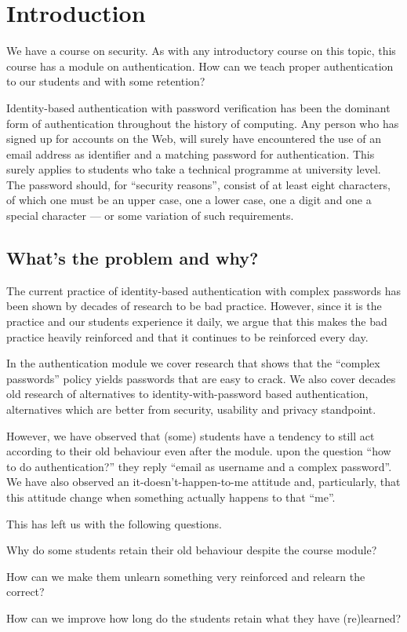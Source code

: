 \section{Introduction}

We have a course on security.
As with any introductory course on this topic, this course has a module on 
authentication.
How can we teach proper authentication to our students and with some retention?

Identity-based authentication with password verification has been the dominant 
form of authentication throughout the history of computing.
Any person who has signed up for accounts on the Web, will surely have 
encountered the use of an email address as identifier and a matching password 
for authentication.
This surely applies to students who take a technical programme at university 
level.
The password should, for \enquote{security reasons}, consist of at least eight 
characters, of which one must be an upper case, one a lower case, one a digit 
and one a special character --- or some variation of such requirements.

\subsection{What's the problem and why?}

The current practice of identity-based authentication with complex passwords 
has been shown by decades of research to be bad practice.
However, since it is the practice and our students experience it daily, we 
argue that this makes the bad practice heavily reinforced and that it continues 
to be reinforced every day.

In the authentication module we cover research that shows that the 
\enquote{complex passwords} policy yields passwords that are easy to crack.
We also cover decades old research of alternatives to identity-with-password 
based authentication, alternatives which are better from security, usability 
and privacy standpoint.

However, we have observed that (some) students have a tendency to still act 
according to their old behaviour even after the module.
\Ie upon the question \enquote{how to do authentication?} they reply 
\enquote{email as username and a complex password}.
We have also observed an it-doesn't-happen-to-me attitude and, particularly, 
that this attitude change when something actually happens to that \enquote{me}.

This has left us with the following questions.
\begin{rqs}
\item\label{rq-nochange}
  Why do some students retain their old behaviour despite the course module?

\item\label{rq-unlearn}
  How can we make them unlearn something very reinforced and relearn the 
  correct?

\item\label{rq-retention}
  How can we improve how long do the students retain what they have 
  (re)learned?
\end{rqs}

